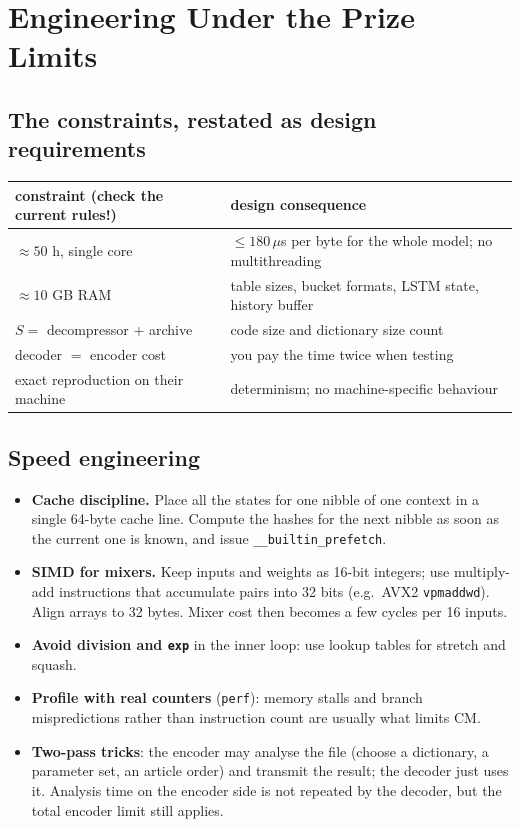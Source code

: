 \documentclass[11pt,a4paper,openany]{book}
\newcommand{\code}[1]{\texttt{#1}}
\theoremstyle{definition}
\theoremstyle{remark}
\begin{document}
\chapter{Engineering Under the Prize Limits}

\section{The constraints, restated as design requirements}

\begin{center}
\begin{tabular}{@{}ll@{}}
\toprule
constraint (check the current rules!) & design consequence\\
\midrule
$\approx50$ h, single core & $\le180\,\mu$s per byte for the whole model; no multithreading\\
$\approx10$ GB RAM & table sizes, bucket formats, LSTM state, history buffer\\
$S=$ decompressor + archive & code size and dictionary size count\\
decoder $=$ encoder cost & you pay the time twice when testing\\
exact reproduction on their machine & determinism; no machine-specific behaviour\\
\bottomrule
\end{tabular}
\end{center}

\section{Speed engineering}

\begin{itemize}
\item \textbf{Cache discipline.} Place all the states for one nibble of one context in a single 64-byte cache line. Compute the hashes for the next nibble as soon as the current one is known, and issue \code{\_\_builtin\_prefetch}.
\item \textbf{SIMD for mixers.} Keep inputs and weights as 16-bit integers; use multiply-add instructions that accumulate pairs into 32 bits (e.g.\ AVX2 \code{vpmaddwd}). Align arrays to 32 bytes. Mixer cost then becomes a few cycles per 16 inputs.
\item \textbf{Avoid division and \code{exp}} in the inner loop: use lookup tables for stretch and squash.
\item \textbf{Profile with real counters} (\code{perf}): memory stalls and branch mispredictions rather than instruction count are usually what limits CM.
\item \textbf{Two-pass tricks}: the encoder may analyse the file (choose a dictionary, a parameter set, an article order) and transmit the result; the decoder just uses it. Analysis time on the encoder side is not repeated by the decoder, but the total encoder limit still applies.
\end{itemize}
\end{document}
